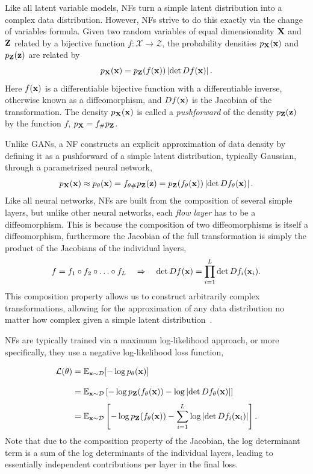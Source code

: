 Like all latent variable models, NFs turn a simple latent distribution into a complex data distribution.
However, NFs strive to do this exactly via the change of variables formula.
Given two random variables of equal dimensionality $\mathbf{X}$ and $\mathbf{Z}$ related by a bijective function $f: \mathcal{X} \rightarrow \mathcal{Z}$, the probability densities $p_{\mathbf{X}}(\mathbf{x})$ and $p_{\mathbf{Z}}(\mathbf{z})$ are related by
\begin{equation}
    \label{eq:change_of_variables}
    p_{\mathbf{X}}(\mathbf{x}) = p_{\mathbf{Z}}(f(\mathbf{x})) \left|\det D f(\mathbf{x}) \right|.
\end{equation}
Here $f(\mathbf{x})$ is a differentiable bijective function with a differentiable inverse, otherwise known as a diffeomorphism, and $D f(\mathbf{x})$ is the Jacobian of the transformation.
The density $p_{\mathbf{X}}(\mathbf{x})$ is called a \textit{pushforward} of the density $p_{\mathbf{Z}}(\mathbf{z})$ by the function $f$, $p_{\mathbf{X}} = f_\# p_{\mathbf{Z}}$.

Unlike GANs, a NF constructs an explicit approximation of data density by defining it as a pushforward of a simple latent distribution, typically Gaussian, through a parametrized neural network,
\begin{equation}
    p_{\mathbf{X}}(\mathbf{x}) \approx p_{\theta}(\mathbf{x}) = f_{\theta \#} p_{\mathbf{Z}}(\mathbf{z}) = p_{\mathbf{Z}}(f_{\theta}(\mathbf{x})) \left|\det D f_{\theta}(\mathbf{x}) \right|.
\end{equation}
Like all neural networks, NFs are built from the composition of several simple layers, but unlike other neural networks, each \textit{flow layer} has to be a diffeomorphism.
This is because the composition of two diffeomorphisms is itself a diffeomorphism, furthermore the Jacobian of the full transformation is simply the product of the Jacobians of the individual layers,
\begin{equation}
    f = f_1 \circ f_2 \circ \ldots \circ f_L \quad \Rightarrow \quad \det D f(\mathbf{x}) = \prod_{i=1}^L \det D f_i(\mathbf{x}_i).
\end{equation}
This composition property allows us to construct arbitrarily complex transformations, allowing for the approximation of any data distribution no matter how complex given a simple latent distribution~\cite{bogachev2005triangular}.

NFs are typically trained via a maximum log-likelihood approach, or more specifically, they use a negative log-likelihood loss function,
\begin{equation}
    \label{eq:nf_loss}
    \begin{aligned}
        \mathcal{L}(\theta)
        \frach &= \mathbb{E}_{\x \sim \mathcal{D}}[-\log p_{\theta}(\x)] \\
        \frach &= \mathbb{E}_{\x \sim \mathcal{D}}\left[-\log p_{\Z}(f_{\theta}(\x)) - \log \left|\det D f_{\theta}(\x) \right|\right] \\
        \frach &= \mathbb{E}_{\x \sim \mathcal{D}}\left[-\log p_{\Z}(f_{\theta}(\x)) - \sum_{i=1}^L \log \left|\det D f_i(\x_i) \right|\right].
    \end{aligned}
\end{equation}
Note that due to the composition property of the Jacobian, the log determinant term is a sum of the log determinants of the individual layers, leading to essentially independent contributions per layer in the final loss.

